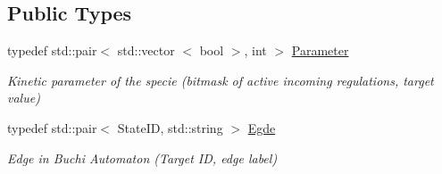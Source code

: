 \subsection*{\-Public \-Types}
\begin{DoxyCompactItemize}
\item 
\hypertarget{classModel_a68b6cea215bd8221cc6f8de2a187b4b4}{typedef std\-::pair$<$ std\-::vector\*
$<$ bool $>$, int $>$ \hyperlink{classModel_a68b6cea215bd8221cc6f8de2a187b4b4}{\-Parameter}}\label{classModel_a68b6cea215bd8221cc6f8de2a187b4b4}

\begin{DoxyCompactList}\small\item\em \-Kinetic parameter of the specie (bitmask of active incoming regulations, target value) \end{DoxyCompactList}\item 
\hypertarget{classModel_a20d1a8ad1917da40f12e7ceb1f87d707}{typedef std\-::pair$<$ \-State\-I\-D, \*
std\-::string $>$ \hyperlink{classModel_a20d1a8ad1917da40f12e7ceb1f87d707}{\-Egde}}\label{classModel_a20d1a8ad1917da40f12e7ceb1f87d707}

\begin{DoxyCompactList}\small\item\em \-Edge in \-Buchi \-Automaton (\-Target \-I\-D, edge label) \end{DoxyCompactList}\end{DoxyCompactItemize}
